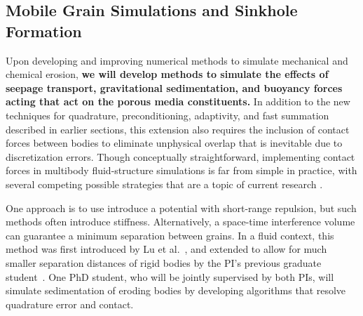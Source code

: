 \documentclass[11pt]{article}
\begin{document}

\subsection{Mobile Grain Simulations and Sinkhole Formation}
\label{sec:sinkhole}

Upon developing and improving numerical methods to simulate mechanical
and chemical erosion, {\bf we will develop methods to simulate the
effects of seepage transport, gravitational sedimentation, and buoyancy
forces acting that act on the porous media constituents.} In addition to
the new techniques for quadrature, preconditioning, adaptivity, and fast
summation described in earlier sections, this extension also requires
the inclusion of contact forces between bodies to eliminate unphysical
overlap that is inevitable due to discretization errors. Though
conceptually straightforward, implementing contact forces in multibody
fluid-structure simulations is far from simple in practice, with several
competing possible strategies that are a topic of current research
\cite{yan2019computing, lu-rah-zor2017, bys-sha-qua2019,
kab-qua-bir2018, vou-har-tam-gri2011}.  

One approach is to use introduce a potential with short-range repulsion, but such methods often introduce stiffness. Alternatively, a space-time interference volume can guarantee a minimum separation between grains.  In a fluid context, this method was first introduced by Lu et al.~\cite{lu-rah-zor2017}, and extended to allow for much smaller separation distances of rigid bodies by the PI's previous graduate student~\cite{bys-sha-qua2019}. One PhD student, who will be jointly supervised by both PIs, will simulate sedimentation of eroding bodies by developing algorithms that resolve quadrature error and contact.  
\end{document}
